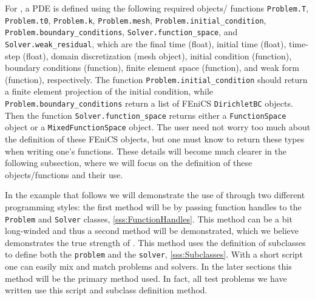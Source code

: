     For \ASP, a PDE is defined using the following required objects\slash
    functions \texttt{Problem.T}, \texttt{Problem.t0}, \texttt{Problem.k},
    \texttt{Problem.mesh}, \texttt{Problem.initial\_condition},
    \texttt{Problem.boundary\_conditions}, \texttt{Solver.function\_space}, and
    \texttt{Solver.weak\_residual}, which are the final time (float), initial
    time (float), time-step (float), domain discretization (mesh object),
    initial condition (function), boundary conditions (function), finite element
    space (function), and weak form (function), respectively. The function
    \texttt{Problem.initial\_condition} should return a finite element
    projection of the initial condition, while
    \texttt{Problem.boundary\_conditions} return a list of FEniCS
    \texttt{DirichletBC} objects. Then the function
    \texttt{Solver.function\_space} returns either a \texttt{FunctionSpace}
    object or a \texttt{MixedFunctionSpace} object. The user need not worry too
    much about the definition of these FEniCS objects, but one must know to
    return these types when writing one's functions. These details will become
    much clearer in the following subsection, where we will focus on the
    definition of these objects\slash functions and their use.

    In the example that follows we will demonstrate the use of \ASP through two
    different programming styles: the first method will be by passing function
    handles to the \texttt{Problem} and \texttt{Solver} classes,
    \autoref{sss:FunctionHandles}. This method can be a bit long-winded and thus
    a second method will be demonstrated, which we believe demonstrates the true
    strength of \ASP. This method uses the definition of subclasses to define
    both the \texttt{problem} and the \texttt{solver}, \autoref{sss:Subclasses}.
    With a short script one can easily mix and match problems and solvers. In
    the later sections this method will be the primary method used. In fact, all
    test problems we have written use this script and subclass definition
    method.

